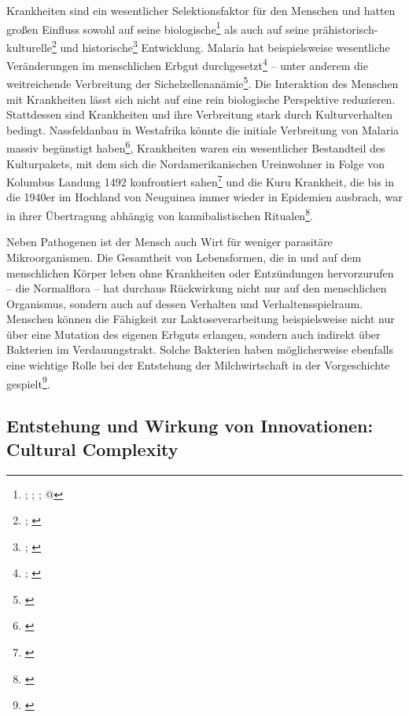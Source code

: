 \documentclass[openany,twoside,twocolumn]{book}
\let\rmarkdownfootnote\footnote%
\def\footnote{\protect\rmarkdownfootnote}
\begin{document}
Krankheiten sind ein wesentlicher Selektionsfaktor für den Menschen und
hatten großen Einfluss sowohl auf seine biologische\footnote{\textcite{bustamante_natural_2005};
  \textcite{enard_viruses_2016}; \textcite{mead_balancing_2003};
  \textcite{sabeti_genome-wide_2007}@} als auch auf seine
prähistorisch-kulturelle\footnote{\textcite{martin_health_2002};
  \textcite{oxenham_skeletal_2005}} und historische\footnote{\textcite{alfani_plague_2013};
  \textcite{murray_estimation_2006}} Entwicklung. Malaria hat
beispielsweise wesentliche Veränderungen im menschlichen Erbgut
durchgesetzt\footnote{\textcite{kwiatkowski_how_2005};
  \textcite{tishkoff_haplotype_2001}} -- unter anderem die weitreichende
Verbreitung der Sichelzellenanämie\footnote{\textcite{allison_protection_1954}}.
Die Interaktion des Menschen mit Krankheiten lässt sich nicht auf eine
rein biologische Perspektive reduzieren. Stattdessen sind Krankheiten
und ihre Verbreitung stark durch Kulturverhalten bedingt. Nassfeldanbau
in Westafrika könnte die initiale Verbreitung von Malaria massiv
begünstigt haben\footnote{\textcite{durham_coevolution_1991-1}},
Krankheiten waren ein wesentlicher Bestandteil des Kulturpakets, mit dem
sich die Nordamerikanischen Ureinwohner in Folge von Kolumbus Landung
1492 konfrontiert sahen\footnote{\textcite{nunn_columbian_2010}} und die
Kuru Krankheit, die bis in die 1940er im Hochland von Neuguinea immer
wieder in Epidemien ausbrach, war in ihrer Übertragung abhängig von
kannibalistischen Ritualen\footnote{\textcite{lindenbaum_kuru_2015}}.

Neben Pathogenen ist der Mensch auch Wirt für weniger parasitäre
Mikroorganismen. Die Gesamtheit von Lebensformen, die in und auf dem
menschlichen Körper leben ohne Krankheiten oder Entzündungen
hervorzurufen -- die Normalflora -- hat durchaus Rückwirkung nicht nur
auf den menschlichen Organismus, sondern auch auf dessen Verhalten und
Verhaltensspielraum. Menschen können die Fähigkeit zur
Laktoseverarbeitung beispielsweise nicht nur über eine Mutation des
eigenen Erbguts erlangen, sondern auch indirekt über Bakterien im
Verdauungstrakt. Solche Bakterien haben möglicherweise ebenfalls eine
wichtige Rolle bei der Entstehung der Milchwirtschaft in der
Vorgeschichte gespielt\footnote{\textcite{walter_human_2011}}.

\hypertarget{entstehung-und-wirkung-von-innovationen-cultural-complexity}{%
\subsection{Entstehung und Wirkung von Innovationen: Cultural
Complexity}\label{entstehung-und-wirkung-von-innovationen-cultural-complexity}}
\end{document}
